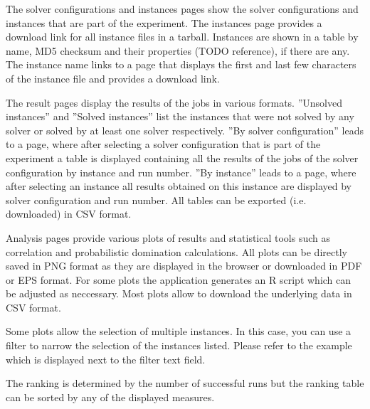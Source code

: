 The solver configurations and instances pages show the solver configurations and instances that are part of the experiment. The instances page provides a download link
for all instance files in a tarball.
Instances are shown in a table by name, MD5 checksum and their properties (TODO reference), if there are any. The instance name links to a page that displays the 
first and last few characters of the instance file and provides a download link.

The result pages display the results of the jobs in various formats. ''Unsolved instances'' and ''Solved instances'' list the instances that
were not solved by any solver or solved by at least one solver respectively. ''By solver configuration'' leads to a page, where after selecting a solver configuration
that is part of the experiment a table is displayed containing all the results of the jobs of the solver configuration by instance and run number.
''By instance'' leads to a page, where after selecting an instance all results obtained on this instance are displayed by solver configuration and run number.
All tables can be exported (i.e. downloaded) in CSV format.

Analysis pages provide various plots of results and statistical tools such as correlation and probabilistic domination calculations. All plots can be directly saved
in PNG format as they are displayed in the browser or downloaded in PDF or EPS format. For some plots the application generates an R script which can be adjusted as
neccessary.
Most plots allow to download the underlying data in CSV format.

Some plots allow the selection of multiple instances. In this case, you can use a filter to narrow the selection of the instances listed. Please refer to the example
which is displayed next to the filter text field.

The ranking is determined by the number of successful runs but the ranking table can be sorted by any of the displayed measures.


